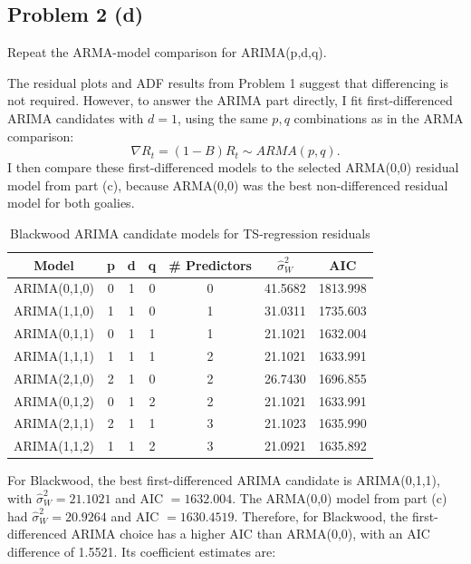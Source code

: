 \documentclass[
  10pt,
]{extarticle}
\begin{document}
\newpage

\subsection{Problem 2 (d)}\label{problem-2-d}

\begin{problem}[Problem 2 (d)]
Repeat the ARMA-model comparison for ARIMA(p,d,q).
\end{problem}

The residual plots and ADF results from Problem 1 suggest that differencing is not required. However, to answer the ARIMA part directly, I fit first-differenced ARIMA candidates with \(d=1\), using the same \(p,q\) combinations as in the ARMA comparison:
\[
\nabla R_t = (1-B)R_t \sim ARMA(p,q).
\]
I then compare these first-differenced models to the selected ARMA(0,0) residual model from part (c), because ARMA(0,0) was the best non-differenced residual model for both goalies.

\begin{center}
\scriptsize
\begin{table}[H]

\caption{\label{tab:p2-arima-blackwood-table}Blackwood ARIMA candidate models for TS-regression residuals}
\centering
\begin{tabular}[t]{ccccccc}
\toprule
Model & p & d & q & \# Predictors & $\hat{\sigma}_W^2$ & AIC\\
\midrule
ARIMA(0,1,0) & 0 & 1 & 0 & 0 & 41.5682 & 1813.998\\
ARIMA(1,1,0) & 1 & 1 & 0 & 1 & 31.0311 & 1735.603\\
ARIMA(0,1,1) & 0 & 1 & 1 & 1 & 21.1021 & 1632.004\\
ARIMA(1,1,1) & 1 & 1 & 1 & 2 & 21.1021 & 1633.991\\
ARIMA(2,1,0) & 2 & 1 & 0 & 2 & 26.7430 & 1696.855\\
\addlinespace
ARIMA(0,1,2) & 0 & 1 & 2 & 2 & 21.1021 & 1633.991\\
ARIMA(2,1,1) & 2 & 1 & 1 & 3 & 21.1023 & 1635.990\\
ARIMA(1,1,2) & 1 & 1 & 2 & 3 & 21.0921 & 1635.892\\
\bottomrule
\end{tabular}
\end{table}
\normalsize
\end{center}

For Blackwood, the best first-differenced ARIMA candidate is ARIMA(0,1,1), with \(\hat{\sigma}_W^2 = 21.1021\) and AIC \(= 1632.004\). The ARMA(0,0) model from part (c) had \(\hat{\sigma}_W^2 = 20.9264\) and AIC \(= 1630.4519\). Therefore, for Blackwood, the first-differenced ARIMA choice has a higher AIC than ARMA(0,0), with an AIC difference of 1.5521. Its coefficient estimates are:
\end{document}
